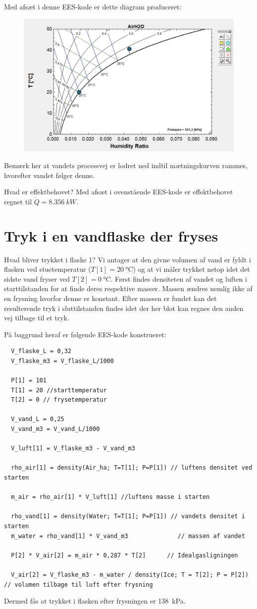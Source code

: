 \documentclass[a4paper]{article}
\begin{document}
Med afsæt i denne EES-kode er dette diagram produceret:
\begin{figure} [ht]
  \centering
  \includegraphics[width=0.5\linewidth]{./figures/e6.png}
  \caption{}
  \label{fig:e6}
\end{figure}

Bemærk her at vandets processvej er lodret ned indtil mætningskurven rammes, hvorefter vandet følger denne.

 Hvad er effektbehovet?
\bigbreak
Med afsæt i ovenstående EES-kode er effektbehovet regnet til $\dot{Q} = \qty{8,356}{kW}$.


\section{Tryk i en vandflaske der fryses}

 Hvad bliver trykket i flaske 1?
\bigbreak
Vi antager at den givne volumen af vand er fyldt i flasken ved stuetemperatur ($T[1] = \qty{20}{\celsius}$) og at vi måler trykket netop idet det sidste vand fryser ved $T[2] = \qty{0}{\celsius}$. Først findes densiteten af vandet og luften i starttilstanden for at finde deres respektive masser. Massen ændres nemlig ikke af en frysning hvorfor denne er konstant. Efter massen er fundet kan det resulterende tryk i sluttilstanden findes idet der her blot kan regnes den anden vej tilbage til et tryk.

På baggrund heraf er følgende EES-kode konstrueret:
\begin{verbatim}
  V_flaske_L = 0,32
  V_flaske_m3 = V_flaske_L/1000
   
  P[1] = 101
  T[1] = 20 //starttemperatur
  T[2] = 0 // frysetemperatur
   
  V_vand_L = 0,25
  V_vand_m3 = V_vand_L/1000
   
  V_luft[1] = V_flaske_m3 - V_vand_m3
   
  rho_air[1] = density(Air_ha; T=T[1]; P=P[1]) // luftens densitet ved starten
   
  m_air = rho_air[1] * V_luft[1] //luftens masse i starten
   
  rho_vand[1] = density(Water; T=T[1]; P=P[1]) // vandets densitet i starten
  m_water = rho_vand[1] * V_vand_m3              // massen af vandet
   
  P[2] * V_air[2] = m_air * 0,287 * T[2]      // Idealgasligningen
   
  V_air[2] = V_flaske_m3 - m_water / density(Ice; T = T[2]; P = P[2])  // volumen tilbage til luft efter frysning
\end{verbatim}
Dermed fås at trykket i flasken efter frysningen er \qty{138}{kPa}. 
\end{document}
